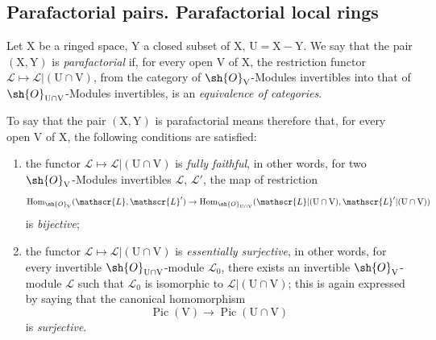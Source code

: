 \subsection{Parafactorial pairs. Parafactorial local rings}
\label{subsection:IV.21.13}

\begin{definition}[21.13.1]
\label{IV.21.13.1}
Let $\mathrm{X}$ be a ringed space, $\mathrm{Y}$ a closed subset of $\mathrm{X}$, $\mathrm{U}=\mathrm{X}-\mathrm{Y}$.
We say that the pair $(\mathrm{X},\mathrm{Y})$ is \emph{parafactorial} if, for every open $\mathrm{V}$ of $\mathrm{X}$, the restriction functor $\mathscr{L}\mapsto\mathscr{L}|(\mathrm{U}\cap\mathrm{V})$, from the category of $\sh{O}_{\mathrm{V}}$-Modules invertibles into that of $\sh{O}_{\mathrm{U}\cap\mathrm{V}}$-Modules invertibles, is an \emph{equivalence of categories}.
\end{definition}

To say that the pair $(\mathrm{X},\mathrm{Y})$ is parafactorial means therefore that, for every open $\mathrm{V}$ of $\mathrm{X}$, the following conditions are satisfied:
\begin{enumerate}[label=\arabic*\textsuperscript{o}]
  \item the functor $\mathscr{L}\mapsto\mathscr{L}|(\mathrm{U}\cap\mathrm{V})$ is \emph{fully faithful}, in other words, for two $\sh{O}_{\mathrm{V}}$-Modules invertibles $\mathscr{L}$, $\mathscr{L}'$, the map of restriction
  \[
    \operatorname{Hom}_{\sh{O}_{\mathrm{V}}}(\mathscr{L},\mathscr{L}')\to\operatorname{Hom}_{\sh{O}_{\mathrm{U}\cap\mathrm{V}}}(\mathscr{L}|(\mathrm{U}\cap\mathrm{V}),\mathscr{L}'|(\mathrm{U}\cap\mathrm{V}))
  \]
  is \emph{bijective};
  \item the functor $\mathscr{L}\mapsto\mathscr{L}|(\mathrm{U}\cap\mathrm{V})$ is \emph{essentially surjective}, in other words, for every invertible $\sh{O}_{\mathrm{U}\cap\mathrm{V}}$-module $\mathscr{L}_0$, there exists an invertible $\sh{O}_{\mathrm{V}}$-module $\mathscr{L}$ such that $\mathscr{L}_0$ is
isomorphic to $\mathscr{L}|(\mathrm{U}\cap\mathrm{V})$; this is again expressed by saying that the canonical homomorphism 
  \[
    \operatorname{Pic}(\mathrm{V})\to\operatorname{Pic}(\mathrm{U}\cap\mathrm{V})
  \]
  is \emph{surjective}.
\end{enumerate}

